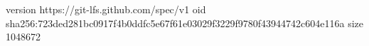 version https://git-lfs.github.com/spec/v1
oid sha256:723ded281bc0917f4b0ddfc5e67f61e03029f3229f9780f43944742c604e116a
size 1048672
